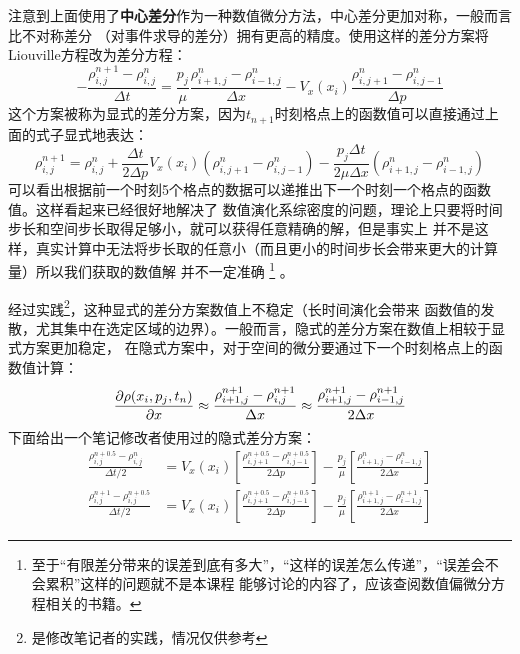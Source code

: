     注意到上面使用了\textbf{中心差分}作为一种数值微分方法，中心差分更加对称，一般而言比不对称差分
    （对事件求导的差分）拥有更高的精度。使用这样的差分方案将Liouville方程改为差分方程：
    \begin{equation}
        -\frac{\rho_{i, j}^{n+1} - \rho_{i, j}^{n}}{\Delta t} = \frac{p_j}{\mu}
        \frac{\rho_{i+1, j}^{n} - \rho_{i-1, j}^{n}}{\Delta x} - V_x(x_i)
        \frac{\rho_{i, j+1}^{n} - \rho_{i, j-1}^{n}}{\Delta p}
    \end{equation}
    这个方案被称为显式的差分方案，因为$t_{n+1}$时刻格点上的函数值可以直接通过上面的式子显式地表达：
    \begin{equation}
        \rho_{i, j}^{n+1} = \rho_{i, j}^{n} + \frac{\Delta t}{2\Delta p}V_{x}(x_i)(\rho_{i, j+1}^{n} - \rho_{i, j-1}^{n})
        - \frac{p_j\Delta t}{2 \mu \Delta x}(\rho_{i+1, j}^{n} - \rho_{i-1, j}^{n}) 
    \end{equation}
    可以看出根据前一个时刻5个格点的数据可以递推出下一个时刻一个格点的函数值。这样看起来已经很好地解决了
    数值演化系综密度的问题，理论上只要将时间步长和空间步长取得足够小，就可以获得任意精确的解，但是事实上
    并不是这样，真实计算中无法将步长取的任意小（而且更小的时间步长会带来更大的计算量）所以我们获取的数值解
    并不一定准确
    \footnote{
        至于“有限差分带来的误差到底有多大”，“这样的误差怎么传递”，“误差会不会累积”这样的问题就不是本课程
        能够讨论的内容了，应该查阅数值偏微分方程相关的书籍。
    }
    。
    \par 
    经过实践\footnote{是修改笔记者的实践，情况仅供参考}，这种显式的差分方案数值上不稳定（长时间演化会带来
    函数值的发散，尤其集中在选定区域的边界）。一般而言，隐式的差分方案在数值上相较于显式方案更加稳定，
    在隐式方案中，对于空间的微分要通过下一个时刻格点上的函数值计算：
    \begin{equation}
        \frac{\partial{\rho(x_i, p_j, t_n)}}{\partial{x}} \approx \frac{\rho_{i + 1, j}^{n+1} - \rho_{i, j}^{n+1}}{\Delta x}
             \approx \frac{\rho_{i + 1, j}^{n+1} - \rho_{i-1, j}^{n+1}}{2\Delta x}
    \end{equation}
    下面给出一个笔记修改者使用过的隐式差分方案：
    \begin{equation}
        \begin{split}
            \frac{\rho_{i,j}^{n+0.5} - \rho_{i,j}^{n}}{\Delta t/2} &= V_{x}(x_{i})\left[\frac{\rho_{i,j+1}^{n+0.5} - 
            \rho_{i,j-1}^{n+0.5}}{2\Delta p}\right] - \frac{p_{j}}{\mu}\left[\frac{\rho_{i+1,j}^{n} - 
            \rho_{i-1,j}^{n}}{2\Delta x}\right]\\
            \frac{\rho_{i,j}^{n+1} - \rho_{i,j}^{n+0.5}}{\Delta t/2} &= V_{x}(x_{i})\left[\frac{\rho_{i,j+1}^{n+0.5} -
            \rho_{i,j-1}^{n+0.5}}{2\Delta p}\right] - \frac{p_{j}}{\mu}\left[\frac{\rho_{i+1,j}^{n+1} - 
            \rho_{i-1,j}^{n+1}}{2\Delta x}\right]
        \end{split}
    \end{equation}
